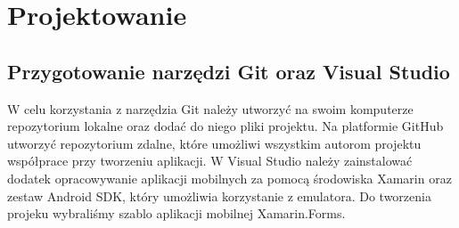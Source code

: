 	\newpage
\section{Projektowanie}		%

\subsection{Przygotowanie narzędzi Git oraz Visual Studio}

\hspace{1cm}W celu korzystania z narzędzia Git należy utworzyć na swoim komputerze repozytorium lokalne oraz dodać do niego pliki projektu. Na platformie GitHub utworzyć repozytorium zdalne, które umożliwi wszystkim autorom projektu współprace przy tworzeniu aplikacji.
\newline
W Visual Studio należy zainstalować dodatek opracowywanie aplikacji mobilnych za pomocą środowiska Xamarin oraz zestaw Android SDK, który umożliwia korzystanie z emulatora.
Do tworzenia projeku wybraliśmy szablo aplikacji mobilnej Xamarin.Forms.

